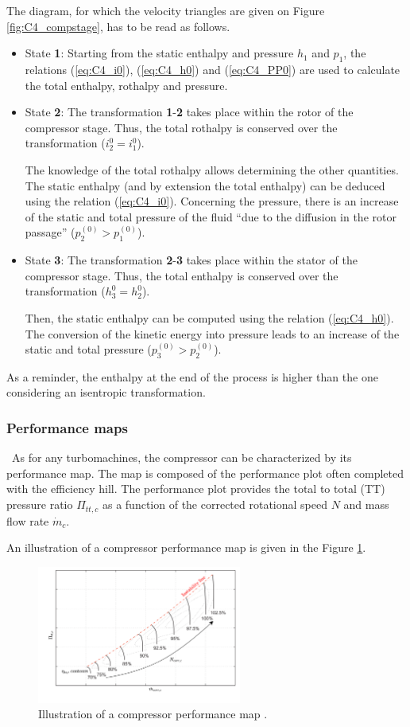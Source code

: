 The diagram, for which the velocity triangles are given on Figure \ref{fig:C4_compstage}, has to be read as follows.
\begin{itemize}
    \item State \textbf{1}: Starting from the static enthalpy and pressure \(h_1\) and \(p_1\), the relations (\ref{eq:C4_i0}), (\ref{eq:C4_h0}) and (\ref{eq:C4_PP0}) are used to calculate the total enthalpy, rothalpy and pressure.
    \item State \textbf{2}: The transformation \textbf{1}-\textbf{2} takes place within the rotor of the compressor stage. Thus, the total rothalpy is conserved over the transformation ($i_2^0=i_1^0$).

    The knowledge of the total rothalpy allows determining the other quantities. The static enthalpy (and by extension the total enthalpy) can be deduced using the relation (\ref{eq:C4_i0}). Concerning the pressure, there is an increase of the static and total pressure of the fluid “due to the diffusion in the rotor passage” \cite{Hillewaert2019} ($p_2^{(0)} > p_1^{(0)}$).

    \item State \textbf{3}: The transformation \textbf{2}-\textbf{3} takes place within the stator of the compressor stage. Thus, the total enthalpy is conserved over the transformation ($h_3^0 = h_2^0$).

    Then, the static enthalpy can be computed using the relation (\ref{eq:C4_h0}). The conversion of the kinetic energy into pressure leads to an increase of the static and total pressure ($p_3^{(0)} > p_2^{(0)}$).
\end{itemize}
As a reminder, the enthalpy at the end of the process is higher than the one considering an isentropic transformation.
\subsubsection{Performance maps}
\quad\ As for any turbomachines, the compressor can be characterized by its performance map. The map is composed of the performance plot often completed with the efficiency hill. The performance plot provides the total to total (TT) pressure ratio \(\Pi_{tt,c}\) as a function of the corrected rotational speed \(N\) and mass flow rate \(\dot{m}_c\).

An illustration of a compressor performance map is given in the Figure \ref{fig:C4_compmap}.
\begin{figure}[h]
    \centering
    \includegraphics[width=0.6\textwidth]{Comp_Map.png}
    \caption{Illustration of a compressor performance map \cite{Ghorbanian2009}.}
    \label{fig:C4_compmap}
\end{figure}

